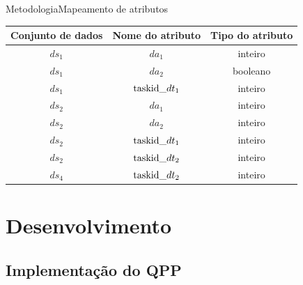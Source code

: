 \documentclass[12pt,compress,final]{beamer}
\begin{document}
{\begin{frame}[t]{Metodologia}{Mapeamento de atributos}
{\begin{table}[!htb]
    \small
    \centering
    \begin{tabular}{c|c|c}
    \textbf{Conjunto de dados} & \textbf{Nome do atributo} & \textbf{Tipo do atributo} \\ \hline
\rowcolor{red!10}
$ds_1$                        & $da_1$                        & inteiro                 \\
$ds_1$                        & $da_2$                        & booleano                \\
\rowcolor{blue!10}
$ds_1$                        & $\textup{taskid\_}dt_1$      & inteiro                 \\ \hline
\rowcolor{red!10}
$ds_2$                        & $da_1$                        & inteiro                 \\
$ds_2$                        & $da_2$                        & inteiro                 \\
\rowcolor{blue!10}
$ds_2$                        & $\textup{taskid\_}dt_1$      & inteiro                 \\
\rowcolor{green!10}
$ds_2$                        & $\textup{taskid\_}dt_2$      & inteiro                 \\ \hline
\rowcolor{green!10}
$ds_4$                        & $\textup{taskid\_}dt_2$      & inteiro                  
    \end{tabular}
\end{table}
}

\end{frame}
}


\section{Desenvolvimento}
\subsection*{Implementação do QPP}
\end{document}
